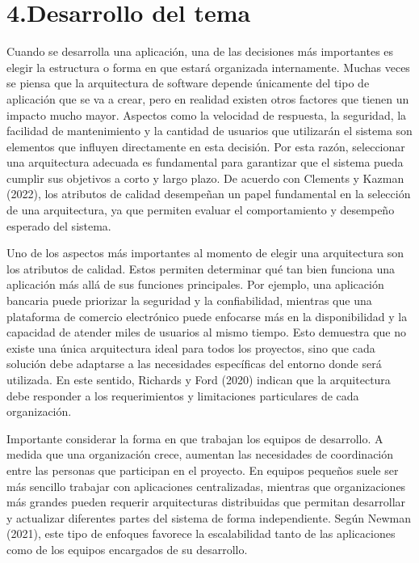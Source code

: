 \documentclass[12pt,letterpaper]{article}
\begin{document}
\section*{4.Desarrollo del tema}
Cuando se desarrolla una aplicación, una de las decisiones más importantes es elegir la estructura o forma en que estará organizada internamente. Muchas veces se piensa que la arquitectura de software depende únicamente del tipo de aplicación que se va a crear, pero en realidad existen otros factores que tienen un impacto mucho mayor. Aspectos como la velocidad de respuesta, la seguridad, la facilidad de mantenimiento y la cantidad de usuarios que utilizarán el sistema son elementos que influyen directamente en esta decisión. Por esta razón, seleccionar una arquitectura adecuada es fundamental para garantizar que el sistema pueda cumplir sus objetivos a corto y largo plazo. De acuerdo con Clements y Kazman (2022), los atributos de calidad desempeñan un papel fundamental en la selección de una arquitectura, ya que permiten evaluar el comportamiento y desempeño esperado del sistema.

Uno de los aspectos más importantes al momento de elegir una arquitectura son los atributos de calidad. Estos permiten determinar qué tan bien funciona una aplicación más allá de sus funciones principales. Por ejemplo, una aplicación bancaria puede priorizar la seguridad y la confiabilidad, mientras que una plataforma de comercio electrónico puede enfocarse más en la disponibilidad y la capacidad de atender miles de usuarios al mismo tiempo. Esto demuestra que no existe una única arquitectura ideal para todos los proyectos, sino que cada solución debe adaptarse a las necesidades específicas del entorno donde será utilizada. En este sentido, Richards y Ford (2020) indican que la arquitectura debe responder a los requerimientos y limitaciones particulares de cada organización.

Importante considerar la forma en que trabajan los equipos de desarrollo. A medida que una organización crece, aumentan las necesidades de coordinación entre las personas que participan en el proyecto. En equipos pequeños suele ser más sencillo trabajar con aplicaciones centralizadas, mientras que organizaciones más grandes pueden requerir arquitecturas distribuidas que permitan desarrollar y actualizar diferentes partes del sistema de forma independiente. Según Newman (2021), este tipo de enfoques favorece la escalabilidad tanto de las aplicaciones como de los equipos encargados de su desarrollo.
\end{document}
